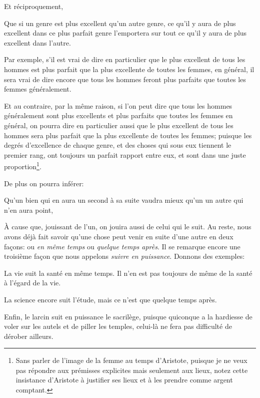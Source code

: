 Et réciproquement, 
\begin{emphpar}
    Que si un genre est plus excellent qu'un autre genre, ce qu'il y aura de plus excellent dans ce plus parfait genre
	l'emportera sur tout ce qu'il y aura de plus excellent dans l'autre.
\end{emphpar}

Par exemple, s'il est vrai de dire en particulier que le plus excellent de tous les hommes est plus parfait que la plus
excellente de toutes les femmes, en général, il sera vrai de dire encore que tous les hommes feront plus parfaits que
toutes les femmes généralement. 

Et au contraire, par la même raison, si l'on peut dire que tous les hommes généralement sont plus excellents et plus parfaits
que toutes les femmes en général, on pourra dire en particulier aussi que le plus excellent de tous les hommes sera plus
parfait que la plus excellente de toutes les femmes; puisque les degrés d'excellence de chaque genre, et des choses qui sous
eux tiennent le premier rang, ont toujours un parfait rapport entre eux, et sont dans une juste proportion\footnote{Sans parler
de l'image de la femme au temps d'Aristote, puisque je ne veux pas répondre aux prémisses explicites mais seulement aux lieux,
notez cette insistance d'Aristote à justifier ses lieux et à les prendre comme argent comptant.}.

\bigbreak 

De plus on pourra inférer:

\begin{emphpar}
    Qu'un bien qui en aura un second à sa suite vaudra mieux qu'un un autre qui n'en aura point,
\end{emphpar}

À cause que, jouissant de l'un, on jouira aussi de celui qui le suit. Au reste, nous avons déjà fait
savoir qu'une chose peut venir en suite d'une autre en deux façons: ou \emph{en même temps} ou \emph{
quelque temps après}. Il se remarque encore une troisième façon que nous appelons \emph{suivre en 
puissance}. Donnons des exemples:

La vie suit la santé en même temps. Il n'en est pas toujours de même de la santé à l'égard de la vie.

La science encore suit l’étude, mais ce n'est que quelque temps après.

Enfin, le larcin suit en puissance le sacrilège, puisque quiconque a la hardiesse de voler sur les autels
et de piller les temples, celui-là ne fera pas difficulté de dérober ailleurs.

